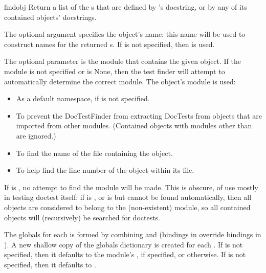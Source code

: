 \begin{methoddesc}{find}{obj}
    Return a list of the s that are defined by
    's docstring, or by any of its contained objects'
    docstrings.

    The optional argument  specifies the object's name; this
    name will be used to construct names for the returned
    s.  If  is not specified, then
     is used.

    The optional parameter  is the module that contains
    the given object.  If the module is not specified or is None, then
    the test finder will attempt to automatically determine the
    correct module.  The object's module is used:

    \begin{itemize}
    \item As a default namespace, if  is not specified.
    \item To prevent the DocTestFinder from extracting DocTests
          from objects that are imported from other modules.  (Contained
          objects with modules other than  are ignored.)
    \item To find the name of the file containing the object.
    \item To help find the line number of the object within its file.
    \end{itemize}

    If  is , no attempt to find the module
    will be made.  This is obscure, of use mostly in testing doctest
    itself: if  is , or is  but
    cannot be found automatically, then all objects are considered to
    belong to the (non-existent) module, so all contained objects will
    (recursively) be searched for doctests.

    The globals for each  is formed by combining
     and  (bindings in 
    override bindings in ).  A new shallow copy of the globals
    dictionary is created for each .  If  is
    not specified, then it defaults to the module's , if
    specified, or \code{\{\}} otherwise.  If  is not
    specified, then it defaults to \code{\{\}}.
\end{methoddesc}


